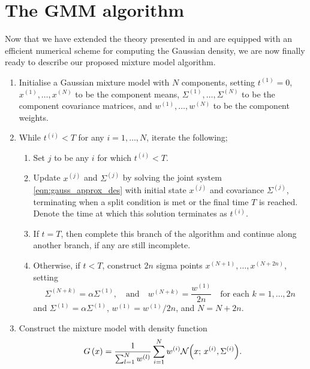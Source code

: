 \section{The GMM algorithm}\label{sec:gmm_alg}

Now that we have extended the theory presented in  and are equipped with an efficient numerical scheme for computing the Gaussian density, we are now finally ready to describe our proposed mixture model algorithm.



\begin{enumerate}
	\item Initialise a Gaussian mixture model with \(N\) components, setting \(t^{(1)} = 0\), \(x^{(1)},\dotsc, x^{(N)}\) to be the component means, \(\Sigma^{(1)}, \dotsc, \Sigma^{(N)}\) to be the component covariance matrices, and \(w^{(1)}, \dotsc, w^{(N)}\) to be the component weights.

	\item While \(t^{(i)} < T\) for any \(i = 1,\dotsc, N\), iterate the following;

	      \begin{enumerate}
		      \item Set \(j\) to be any \(i\) for which \(t^{(i)} < T\).

		      \item Update \(x^{(j)}\) and \(\Sigma^{(j)}\) by solving the joint system \eqref{eqn:gauss_approx_des} with initial state \(x^{(j)}\) and covariance \(\Sigma^{(j)}\), terminating when a split condition is met or the final time \(T\) is reached.
		            Denote the time at which this solution terminates as \(t^{(i)}\).

		      \item If \(t = T\), then complete this branch of the algorithm and continue along another branch, if any are still incomplete.

		      \item Otherwise, if \(t < T\), construct \(2n\) sigma points \(x^{(N + 1)},\dotsc,x^{(N + 2n)}\), setting
		            \[
			            \Sigma^{(N + k)} = \alpha \Sigma^{(1)}, \quad \text{and} \quad w^{(N + k)} = \frac{w^{(1)}}{2n} \quad \text{for each } k = 1,\dotsc,2n
		            \]
		            and \(\Sigma^{(1)} = \alpha \Sigma^{(1)}\), \(w^{(1)} = w^{(1)} / 2n\), and \(N = N + 2n\).
	      \end{enumerate}

	\item Construct the mixture model with density function
	      \[
		      G\left(x\right) = \frac{1}{\sum_{l=1}^{N}w^{(l)}}\sum_{i=1}^{N}{w^{(i)}\mathcal{N}\!\left(x; \, x^{(i)}, \Sigma^{(i)}\right)}.
	      \]

\end{enumerate}

